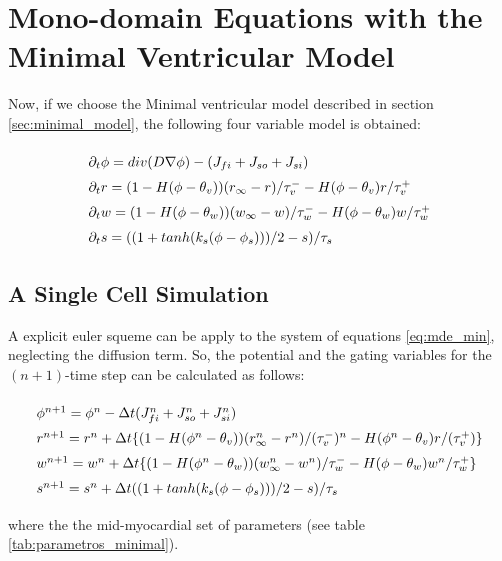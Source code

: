 \section{Mono-domain Equations with the Minimal Ventricular Model}

Now, if we choose the Minimal ventricular model described in section \ref{sec:minimal_model}, the following four variable model is obtained:

\begin{equation}
\arraycolsep=1.4pt\def\arraystretch{1.5}
\begin{array}{lr}
\partial_t \phi = div(D \nabla \phi) - (J_{fi} + J_{so} + J_{si}) \\ 
\partial_t r = (1 - H(\phi - \theta_v))(r_\infty - r)/\tau_{v}^- - H(\phi - \theta_v)r/\tau_v^+ \\
\partial_t w = (1 - H(\phi - \theta_w))(w_\infty - w)/\tau_{w}^- - H(\phi - \theta_w)w/\tau_w^+ \\
\partial_t s = ((1 + tanh(k_s(\phi - \phi_s)))/2 - s)/\tau_s
\end{array} \label{eq:mde_min}
\end{equation}

\subsection{A Single Cell Simulation}

A explicit euler squeme can be apply to the system of equations \ref{eq:mde_min}, neglecting the diffusion term. So, the potential and the gating variables for the $(n+1)$-time step can be calculated as follows:

\begin{equation}
\arraycolsep=1.4pt\def\arraystretch{1.5}
\begin{array}{lr}
\phi^{n + 1} = \phi^n - \Delta t (J_{fi}^n + J_{so}^n + J_{si}^n ) \\ 
r^{n+1} = r^n + \Delta t \{ (1 - H(\phi^n - \theta_v))(r_\infty^n - r^n)/(\tau_{v}^-)^n - H(\phi^n - \theta_v)r/(\tau_v^+) \} \\
w^{n+1} = w^n  + \Delta t \{ (1 - H(\phi^n - \theta_w))(w_\infty^n - w^n)/\tau_{w}^- - H(\phi - \theta_w)w^n/\tau_w^+ \} \\
s^{n+1} = s^n + \Delta t ((1 + tanh(k_s(\phi - \phi_s)))/2 - s)/\tau_s
\end{array} \label{eq:mde_min_exp}
\end{equation}

where the the mid-myocardial set of parameters (see table \ref{tab:parametros_minimal}). \\

